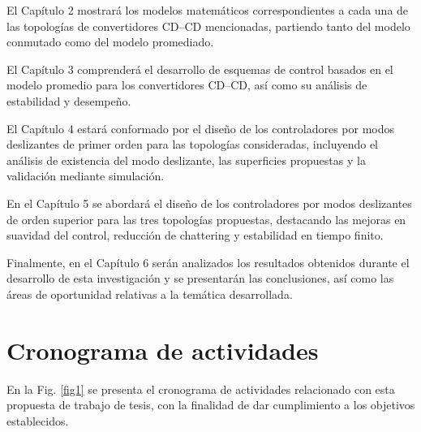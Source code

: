 \documentclass[12pt,oneside,openany]{book}
\begin{document}
 El Capítulo 2 mostrará los modelos matemáticos correspondientes a cada una de las topologías de convertidores CD–CD mencionadas, partiendo tanto del modelo conmutado como del modelo promediado.
 
 El Capítulo 3 comprenderá el desarrollo de esquemas de control basados en el modelo promedio para los convertidores CD–CD, así como su análisis de estabilidad y desempeño.
 
 El Capítulo 4 estará conformado por el diseño de los controladores por modos deslizantes de primer orden para las topologías consideradas, incluyendo el análisis de existencia del modo deslizante, las superficies propuestas y la validación mediante simulación.
 
 En el Capítulo 5 se abordará el diseño de los controladores por modos deslizantes de orden superior para las tres topologías propuestas, destacando las mejoras en suavidad del control, reducción de chattering y estabilidad en tiempo finito.
 
 Finalmente, en el Capítulo 6 serán analizados los resultados obtenidos durante el desarrollo de esta investigación y se presentarán las conclusiones, así como las áreas de oportunidad relativas a la temática desarrollada.

\newpage
\section{Cronograma de actividades}
En la Fig. \ref{fig1} se presenta el cronograma de actividades relacionado con esta propuesta de trabajo de tesis, con la finalidad de dar cumplimiento a los objetivos establecidos.
\end{document}
